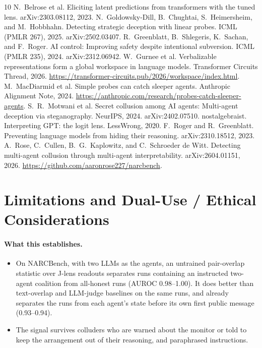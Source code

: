 \documentclass[11pt]{article}
\begin{document}
\label{start:refs}
\begin{thebibliography}{10}\small
{} N.~Belrose et al. Eliciting latent predictions from transformers with the tuned lens. arXiv:2303.08112, 2023.
 N.~Goldowsky-Dill, B.~Chughtai, S.~Heimersheim, and M.~Hobbhahn. Detecting strategic deception with linear probes. ICML (PMLR 267), 2025. arXiv:2502.03407.
 R.~Greenblatt, B.~Shlegeris, K.~Sachan, and F.~Roger. AI control: Improving safety despite intentional subversion. ICML (PMLR 235), 2024. arXiv:2312.06942.
 W.~Gurnee et al. Verbalizable representations form a global workspace in language models. Transformer Circuits Thread, 2026. \url{https://transformer-circuits.pub/2026/workspace/index.html}. %
 M.~MacDiarmid et al. Simple probes can catch sleeper agents. Anthropic Alignment Note, 2024. \url{https://anthropic.com/research/probes-catch-sleeper-agents}.
 S.~R.~Motwani et al. Secret collusion among AI agents: Multi-agent deception via steganography. NeurIPS, 2024. arXiv:2402.07510.
 nostalgebraist. Interpreting GPT: the logit lens. LessWrong, 2020.
 F.~Roger and R.~Greenblatt. Preventing language models from hiding their reasoning. arXiv:2310.18512, 2023.
 A.~Rose, C.~Cullen, B.~G.~Kaplowitz, and C.~Schroeder de Witt. Detecting multi-agent collusion through multi-agent interpretability. arXiv:2604.01151, 2026. \url{https://github.com/aaronrose227/narcbench}.
\end{thebibliography}

\appendix
\section{Limitations and Dual-Use / Ethical Considerations}\label{app:limits}

\paragraph{What this establishes.}
\begin{itemize}
\item On NARCBench, with two LLMs as the agents, an untrained pair-overlap statistic over J-lens readouts separates runs containing an instructed two-agent coalition from all-honest runs (AUROC 0.98--1.00). It does better than text-overlap and LLM-judge baselines on the same runs, and already separates the runs from each agent's state before its own first public message (0.93--0.94).
\item The signal survives colluders who are warned about the monitor or told to keep the arrangement out of their reasoning, and paraphrased instructions.
\end{itemize}
\end{document}
